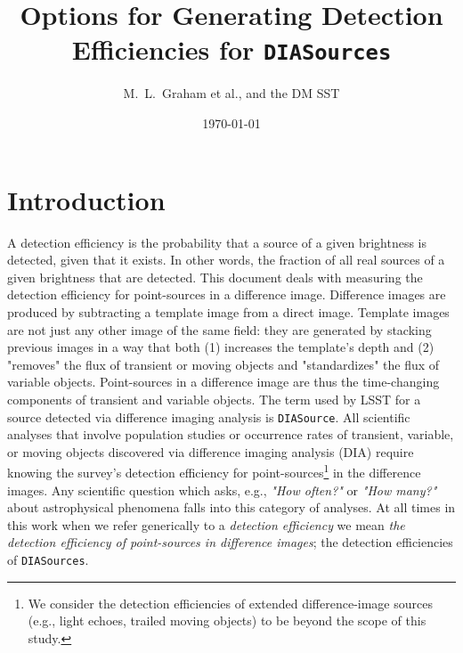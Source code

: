 \documentclass[DM,lsstdraft,toc]{lsstdoc}
\title[Detection Efficiencies]{Options for Generating Detection Efficiencies for {\tt DIASources}}
\author{M.~L.~Graham et al., and the DM SST}
\date{\today}
\begin{document}
\maketitle



\section{Introduction} \label{sec:intro}


A detection efficiency is the probability that a source of a given brightness is detected, given that it exists. In other words, the fraction of all real sources of a given brightness that are detected. This document deals with measuring the detection efficiency for point-sources in a difference image. Difference images are produced by subtracting a template image from a direct image. Template images are not just any other image of the same field: they are generated by stacking previous images in a way that both (1) increases the template's depth and (2) "removes" the flux of transient or moving objects and "standardizes" the flux of variable objects. Point-sources in a difference image are thus the time-changing components of transient and variable objects. The term used by LSST for a source detected via difference imaging analysis is {\tt DIASource}. All scientific analyses that involve population studies or occurrence rates of transient, variable, or moving objects discovered via difference imaging analysis (DIA) require knowing the survey's detection efficiency for point-sources\footnote{We consider the detection efficiencies of extended difference-image sources (e.g., light echoes, trailed moving objects) to be beyond the scope of this study.} in the difference images. Any scientific question which asks, e.g., {\it "How often?"} or {\it "How many?"} about astrophysical phenomena falls into this category of analyses. At all times in this work when we refer generically to a {\it detection efficiency} we mean {\it the detection efficiency of point-sources in difference images}; the detection efficiencies of {\tt DIASources}.
\end{document}
